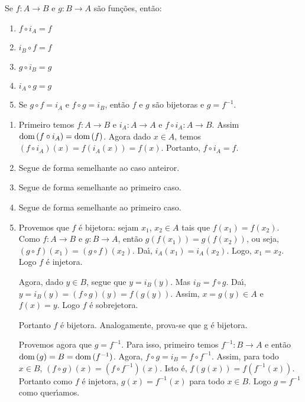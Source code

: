 \begin{proposicao}\label{propriedades_identidade}
	Se $f : A \to B$ e $g : B \to A$ s{\~a}o fun{\c c}{\~o}es, ent{\~a}o:
	\begin{enumerate}[label={\roman*})]
		\item $f\circ i_{A} = f$
		\item $i_{B}\circ f = f$
		\item $g\circ i_{B} = g$
		\item $i_{A}\circ g = g$
		\item Se $g\circ f = i_{A}$ e $f\circ g = i_{B}$, ent{\~a}o $f$ e $g$ s{\~a}o bijetoras e $g=f^{-1}$.
	\end{enumerate}
\end{proposicao}
\begin{prova}
	\begin{enumerate}[label={\roman*})]
		\item Primeiro temos $f: A \to B$ e $i_{A} : A \to A$ e $f\circ i_{A} : A \to B$. Assim ${\rm dom\,}(f\circ i_{A}) = {\rm dom\,}(f)$. Agora dado $x \in A$, temos $(f\circ i_{A})(x) = f(i_{A}(x)) = f(x)$. Portanto, $f\circ i_{A} = f$.
		\item Segue de forma semelhante ao caso anteiror.
		\item Segue de forma semelhante ao primeiro caso.
		\item Segue de forma semelhante ao primeiro caso.
		\item Provemos que $f$ \'e bijetora: sejam $x_1$, $x_2 \in A$ tais que $f(x_1) = f(x_2)$. Como $f : A \to B$ e $g : B \to A$, ent{\~a}o $g(f(x_1)) = g(f(x_2))$, ou seja, $(g\circ f)(x_1) = (g\circ f)(x_2)$. Da{\'\i}, $i_{A}(x_1) = i_{A}(x_2)$. Logo, $x_1 = x_2$. Logo $f$ {\'e} injetora.

		Agora, dado $y \in B$, segue que $y = i_{B}(y)$. Mas $i_{B} = f\circ g$. Da{\'\i}, $y = i_{B}(y) = (f\circ g)(y) = f(g(y))$. Assim, $x = g(y)\in A$ e $f(x) = y$. Logo $f$ {\'e} sobrejetora.

		Portanto $f$ {\'e} bijetora. Analogamente, prova-se que g {\'e} bijetora.

		Provemos agora que $g = f^{-1}$. Para isso, primeiro temos  $f^{-1} : B \to A$ e ent\~ao ${\rm dom\,}(g) = B = {\rm dom\,}(f^{-1})$. Agora, $f\circ g = i_{B} = f\circ f^{-1}$. Assim, para todo $x \in B$, $(f\circ g)(x) = (f\circ f^{-1})(x)$. Isto {\'e}, $f(g(x)) = f(f^{-1}(x))$. Portanto como $f$ \'e injetora, $g(x) = f^{-1}(x)$ para todo $x\in B$. Logo $g = f^{-1}$ como quer{\'\i}amos.
	\end{enumerate}
\end{prova}
